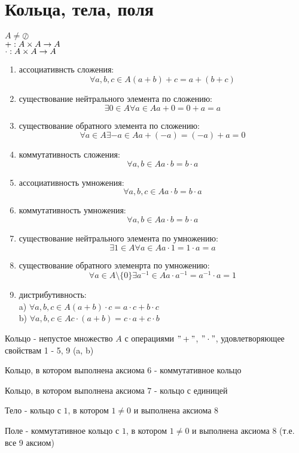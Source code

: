 \section{Кольца, тела, поля}
$A \neq \oslash$\\
$+: A \times A \rightarrow A$\\
$\cdot: A \times A \rightarrow A$\\

\begin{enumerate}
\item ассоциативнсть сложения:
	 $$ \forall a, b, c \in A (a + b) + c = a + (b + c) $$
\item существование нейтрального элемента по сложению:
	$$ \exists 0 \in A \forall a \in A a + 0 = 0 + a = a $$
\item существование обратного элемента по сложению:
	$$ \forall a \in A \exists -a \in A a + (-a) = (-a) + a = 0 $$
\item коммутативность сложения:
	$$ \forall a, b \in A a \cdot b = b \cdot a $$
\item ассоциативность умножения:
	$$ \forall a, b, c \in A a \cdot b = b \cdot a $$
\item коммутативность умножения:
	$$ \forall a, b \in A a \cdot b = b \cdot a $$
\item существование нейтрального элемента по умножению:
	$$ \exists 1 \in A \forall a \in A a \cdot 1 = 1 \cdot a = a $$
\item существование обратного элеменрта по умножению:
 	$$ \forall a \in A \setminus \lbrace 0 \rbrace \exists a^{-1} \in A a \cdot a^{-1} = a^{-1} \cdot a = 1 $$
\item дистрибутивность: \\
	a) $ \forall a, b, c \in A (a + b) \cdot c = a \cdot c + b \cdot c $\\
	b) $ \forall a, b, c \in A c \cdot (a + b) = c \cdot a + c \cdot b $\\
\end{enumerate}

\begin{Def}
	Кольцо - непустое множество $A$ с операциями $"+"$, $"\cdot"$, удовлетворяющее свойствам 1 - 5, 9 (a, b)
\end{Def}
\begin{Def}
	Кольцо, в котором выполнена аксиома 6 - коммутативное кольцо
\end{Def}
\begin{Def}
	Кольцо, в котором выполнена аксиома 7 - кольцо с единицей
\end{Def}
\begin{Def}
	Тело - кольцо с $1$, в котором $1 \neq 0$ и выполнена аксиома 8
\end{Def}
\begin{Def}
	Поле - коммутативное кольцо с $1$, в котором $1 \neq 0$ и выполнена аксиома 8 (т.е. все 9 аксиом)
\end{Def}

